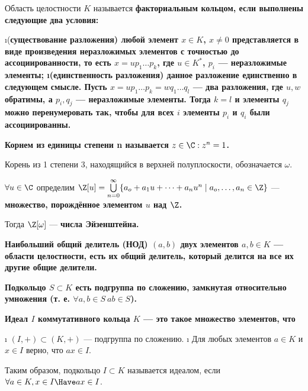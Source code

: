 \begin{defn}
Область целостности \(K\) называется \bf{факториальным кольцом}, если выполнены следующие два условия:
\begin{enumerate}
\i (\bf{существование разложения}) любой элемент \(x \in K\), \(x \neq 0\) представляется в виде произведения неразложимых элементов с точностью до ассоциированности, то есть \(x = u p_1 \ldots p_k\), где \(u \in K^*\), \(p_i\) --- неразложимые элементы;
\i (\bf{единственность разложения}) данное разложение единственно в следующем смысле. Пусть \(x = u p_1 \ldots p_k = w q_1 \ldots q_l\) --- два разложения, где \(u,w\) обратимы, а \(p_i, q_j\) --- неразложимые элементы. Тогда \(k=l\) и элементы \(q_j\) можно перенумеровать так, чтобы для всех \(i\) элементы \(p_i\) и \(q_i\) были ассоциированны.
\end{enumerate}
\end{defn}

\begin{defn}
\bf{Корнем из единицы степени n} называется \(z \in \C: z^n=1\).

Корень из 1 степени 3, находящийся в верхней полуплоскости, обозначается \(\omega\).

\(\forall u \in \C\) определим \(\Z[u] = \bigcup\limits_{n=0}^\infty \{a_o+a_1u+\dots+a_nu^n \mid a_o, \dots, a_n \in \Z \}\) --- \bf{множество, порождённое элементом \(u\) над \(\Z\)}.

Тогда \(\Z[\omega]\) --- \bf{числа Эйзенштейна}.
\end{defn}

\begin{defn}
\bf{Наибольший общий делитель (НОД)} \((a, b)\) двух элементов \(a, b \in K\) --- области целостности, есть их общий делитель, который делится на все их другие общие делители.
\end{defn}

\begin{defn}
\bf{Подкольцо} \(S \subset K\) есть подгруппа по сложению, замкнутая относительно умножения (т. е. \(\forall a, b \in S \ ab \in S\)).
\end{defn}

\begin{defn}
\bf{Идеал} \(I\) коммутативного кольца \(K\) --- это такое множество элементов, что

\begin{enumerate}
\def\labelenumi{\arabic{enumi}.}
\tightlist
\i
  \((I,+) \subset (K,+)\) --- подгруппа по сложению.
\i
  Для любых элементов \(a\in K\) и \(x \in I\) верно, что \(ax \in I\).
\end{enumerate}

Таким образом, подкольцо \(I \subset K\) называется идеалом, если \(\forall a\in K, x \in I \Have ax \in I\).
\end{defn}

